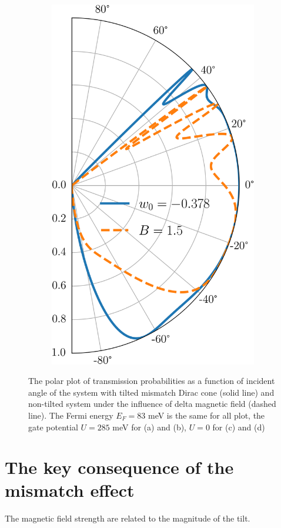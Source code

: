 \begin{figure}[H]
\begin{subfigure}[b]{0.3\linewidth}
            \includegraphics[width = \linewidth]{fig/pseudo B field/Ef0.0832 U0 B1.5 w-0.378.png}
            \caption{}
            \label{fig:pseudo4}
        \end{subfigure}
        \caption{The polar plot of transmission probabilities as a function of incident angle of the system with tilted mismatch Dirac cone 
                (solid line) and non-tilted system under the influence of delta magnetic field (dashed line). The Fermi energy $E_F = 83$ 
                meV is the same for all plot, the gate potential $U = 285$ meV for (a) and (b), $U = 0$ for (c) and (d) }
        \label{fig:pseudo}
    \end{figure}



\section{The key consequence of the mismatch effect}
    The magnetic field strength are related to the magnitude of the tilt.
    

